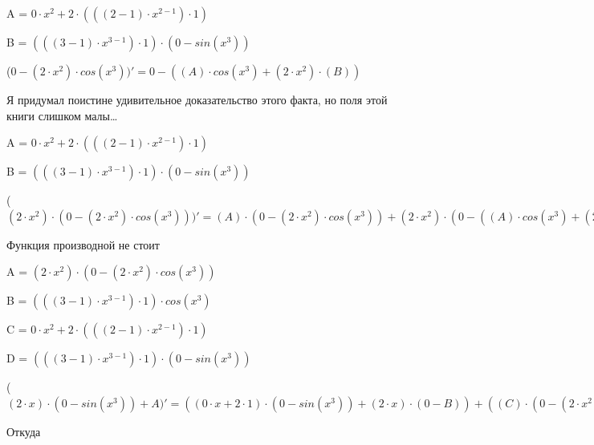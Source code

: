 \documentclass[12pt,a4paper,fleqn]{article}
\begin{document}
\begin{center}
A = $0 \cdot x^{2}+2 \cdot (((2-1) \cdot x^{2-1}) \cdot 1)$\end{center}
\begin{center}
B = $(((3-1) \cdot x^{3-1}) \cdot 1) \cdot (0-sin(x^{3}))$\end{center}
\begin{center}
 ($0-(2 \cdot x^{2}) \cdot cos(x^{3}))'
  = 0-((A) \cdot cos(x^{3})+(2 \cdot x^{2}) \cdot (B))$\end{center}
Я придумал поистине удивительное доказательство этого факта, но поля этой книги слишком малы\ldots

\begin{center}
A = $0 \cdot x^{2}+2 \cdot (((2-1) \cdot x^{2-1}) \cdot 1)$\end{center}
\begin{center}
B = $(((3-1) \cdot x^{3-1}) \cdot 1) \cdot (0-sin(x^{3}))$\end{center}
\begin{center}
 ($(2 \cdot x^{2}) \cdot (0-(2 \cdot x^{2}) \cdot cos(x^{3})))'
  = (A) \cdot (0-(2 \cdot x^{2}) \cdot cos(x^{3}))+(2 \cdot x^{2}) \cdot (0-((A) \cdot cos(x^{3})+(2 \cdot x^{2}) \cdot (B)))$\end{center}
Функция производной не стоит\cite{link2}

\begin{center}
A = $(2 \cdot x^{2}) \cdot (0-(2 \cdot x^{2}) \cdot cos(x^{3}))$\end{center}
\begin{center}
B = $(((3-1) \cdot x^{3-1}) \cdot 1) \cdot cos(x^{3})$\end{center}
\begin{center}
C = $0 \cdot x^{2}+2 \cdot (((2-1) \cdot x^{2-1}) \cdot 1)$\end{center}
\begin{center}
D = $(((3-1) \cdot x^{3-1}) \cdot 1) \cdot (0-sin(x^{3}))$\end{center}
\begin{center}
 ($(2 \cdot x) \cdot (0-sin(x^{3}))+A)'
  = ((0 \cdot x+2 \cdot 1) \cdot (0-sin(x^{3}))+(2 \cdot x) \cdot (0-B))+((C) \cdot (0-(2 \cdot x^{2}) \cdot cos(x^{3}))+(2 \cdot x^{2}) \cdot (0-((C) \cdot cos(x^{3})+(2 \cdot x^{2}) \cdot (D))))$\end{center}
Откуда
\end{document}
